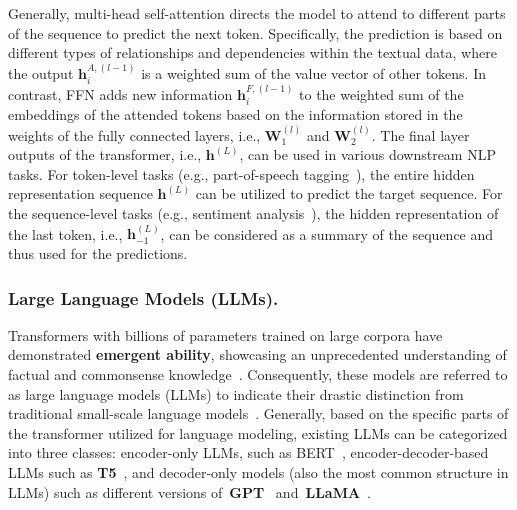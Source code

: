 \documentclass[acmsmall, screen]{acmart}
\begin{document}
Generally, multi-head self-attention directs the model to attend to different parts of the sequence to predict the next token. Specifically, the prediction is based on different types of relationships and dependencies within the textual data, where the output $ \mathbf{h}^{A, (l-1)}_{i}$ is a weighted sum of the value vector of other tokens. In contrast, FFN adds new information $\mathbf{h}^{F, (l-1)}_{i}$ to the weighted sum of the embeddings of the attended tokens based on the information stored in the weights of the fully connected layers, i.e., $\mathbf{W}^{(l)}_1$ and $ \mathbf{W}^{(l)}_2$. The final layer outputs of the transformer, i.e., $\mathbf{h}^{(L)}$, can be used in various downstream NLP tasks. For token-level tasks (e.g., part-of-speech tagging~\cite{chiche2022part}), the entire hidden representation sequence $\mathbf{h}^{(L)}$ can be utilized to predict the target sequence. For the sequence-level tasks (e.g., sentiment analysis~\cite{wankhade2022survey}), the hidden representation of the last token, i.e., $\mathbf{h}^{(L)}_{-1}$, can be considered as a summary of the sequence and thus used for the predictions. 

\subsubsection{\textbf{Large Language Models (LLMs).}}
Transformers with billions of parameters trained on large corpora have demonstrated \textbf{emergent ability}, showcasing an unprecedented understanding of factual and commonsense knowledge~\cite{zhao2023survey}. Consequently, these models are referred to as large language models (LLMs) to indicate their drastic distinction from traditional small-scale language models~\cite{thirunavukarasu2023large,fan2023recommender}. Generally, based on the specific parts of the transformer utilized for language modeling, existing LLMs can be categorized into three classes: encoder-only LLMs, such as BERT~\cite{kenton2019bert},
encoder-decoder-based LLMs such as \textbf{T5}~\cite{raffel2020exploring}, %
and decoder-only models (also the most common structure in LLMs) such as different versions of~\textbf{GPT}~\cite{radford2018improving} 
and~\textbf{LLaMA}~\cite{touvron2023llama}. %


\end{document}

